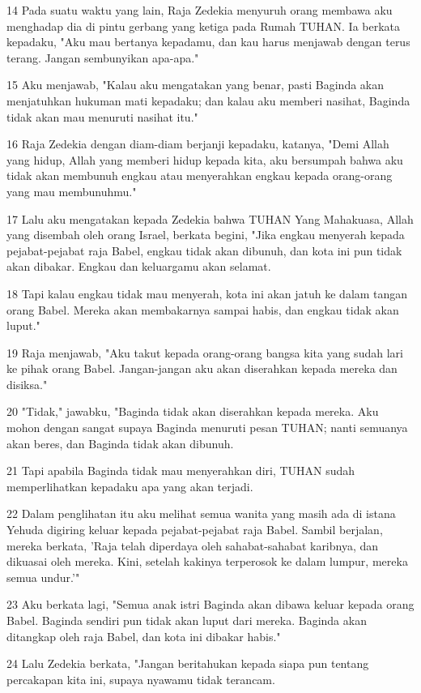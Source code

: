 \par 14 Pada suatu waktu yang lain, Raja Zedekia menyuruh orang membawa aku menghadap dia di pintu gerbang yang ketiga pada Rumah TUHAN. Ia berkata kepadaku, "Aku mau bertanya kepadamu, dan kau harus menjawab dengan terus terang. Jangan sembunyikan apa-apa."
\par 15 Aku menjawab, "Kalau aku mengatakan yang benar, pasti Baginda akan menjatuhkan hukuman mati kepadaku; dan kalau aku memberi nasihat, Baginda tidak akan mau menuruti nasihat itu."
\par 16 Raja Zedekia dengan diam-diam berjanji kepadaku, katanya, "Demi Allah yang hidup, Allah yang memberi hidup kepada kita, aku bersumpah bahwa aku tidak akan membunuh engkau atau menyerahkan engkau kepada orang-orang yang mau membunuhmu."
\par 17 Lalu aku mengatakan kepada Zedekia bahwa TUHAN Yang Mahakuasa, Allah yang disembah oleh orang Israel, berkata begini, "Jika engkau menyerah kepada pejabat-pejabat raja Babel, engkau tidak akan dibunuh, dan kota ini pun tidak akan dibakar. Engkau dan keluargamu akan selamat.
\par 18 Tapi kalau engkau tidak mau menyerah, kota ini akan jatuh ke dalam tangan orang Babel. Mereka akan membakarnya sampai habis, dan engkau tidak akan luput."
\par 19 Raja menjawab, "Aku takut kepada orang-orang bangsa kita yang sudah lari ke pihak orang Babel. Jangan-jangan aku akan diserahkan kepada mereka dan disiksa."
\par 20 "Tidak," jawabku, "Baginda tidak akan diserahkan kepada mereka. Aku mohon dengan sangat supaya Baginda menuruti pesan TUHAN; nanti semuanya akan beres, dan Baginda tidak akan dibunuh.
\par 21 Tapi apabila Baginda tidak mau menyerahkan diri, TUHAN sudah memperlihatkan kepadaku apa yang akan terjadi.
\par 22 Dalam penglihatan itu aku melihat semua wanita yang masih ada di istana Yehuda digiring keluar kepada pejabat-pejabat raja Babel. Sambil berjalan, mereka berkata, 'Raja telah diperdaya oleh sahabat-sahabat karibnya, dan dikuasai oleh mereka. Kini, setelah kakinya terperosok ke dalam lumpur, mereka semua undur.'"
\par 23 Aku berkata lagi, "Semua anak istri Baginda akan dibawa keluar kepada orang Babel. Baginda sendiri pun tidak akan luput dari mereka. Baginda akan ditangkap oleh raja Babel, dan kota ini dibakar habis."
\par 24 Lalu Zedekia berkata, "Jangan beritahukan kepada siapa pun tentang percakapan kita ini, supaya nyawamu tidak terancam.
